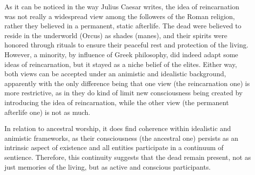 As it can be noticed in the way Julius Caesar writes, the idea of reincarnation was not really a widespread view
among the followers of the Roman religion, rather they believed in a permanent, static afterlife. The dead were
believed to reside in the underworld (Orcus) as shades (manes), and their spirits were honored through rituals
to ensure their peaceful rest and protection of the living. However, a minority, by influence of Greek philosophy,
did indeed adapt some ideas of reincarnation, but it stayed as a niche belief of the elites. Either way, both views
can be accepted under an animistic and idealistic background, apparently with the only difference being that one
view (the reincarnation one) is more restrictive, as in they do kind of limit new consciousness being created by
introducing the idea of reincarnation, while the other view (the permanent afterlife one) is not as much.

In relation to ancestral worship, it does find coherence within idealistic and animistic frameworks, as their
consciousness (the ancestral one) persists as an intrinsic aspect of existence and all entities participate in a
continuum of sentience. Therefore, this continuity suggests that the dead remain present, not as just memories of
the living, but as active and conscious participants.